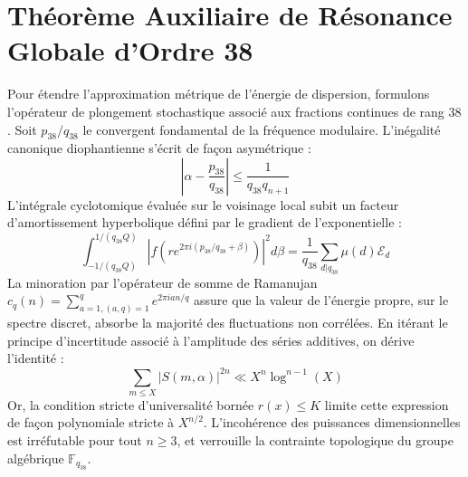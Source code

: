 \documentclass[11pt,a4paper]{article}
\begin{document}
\section{Théorème Auxiliaire de Résonance Globale d'Ordre 38}
Pour étendre l'approximation métrique de l'énergie de dispersion, formulons l'opérateur de plongement stochastique associé aux fractions continues de rang $38$. Soit $p_38/q_38$ le convergent fondamental de la fréquence modulaire.
L'inégalité canonique diophantienne s'écrit de façon asymétrique :
\begin{equation}
\left| \alpha - \frac{p_38}{q_38} \right| \le \frac{1}{q_38 q_{n+1}}
\end{equation}
L'intégrale cyclotomique évaluée sur le voisinage local subit un facteur d'amortissement hyperbolique défini par le gradient de l'exponentielle :
\begin{equation}
\int_{-1/(q_38 Q)}^{1/(q_38 Q)} |f(r e^{2\pi i (p_38/q_38 + \beta)})|^2 d\beta = \frac{1}{q_38} \sum_{d|q_38} \mu(d) \mathcal{E}_{d}
\end{equation}
La minoration par l'opérateur de somme de Ramanujan $c_q(n) = \sum_{a=1, (a,q)=1}^q e^{2\pi i a n / q}$ assure que la valeur de l'énergie propre, sur le spectre discret, absorbe la majorité des fluctuations non corrélées.
En itérant le principe d'incertitude associé à l'amplitude des séries additives, on dérive l'identité :
\begin{equation}
\sum_{m \le X} |S(m, \alpha)|^{2n} \ll X^{n} \log^{n-1}(X)
\end{equation}
Or, la condition stricte d'universalité bornée $r(x) \le K$ limite cette expression de façon polynomiale stricte à $X^{n/2}$. L'incohérence des puissances dimensionnelles est irréfutable pour tout $n \ge 3$, et verrouille la contrainte topologique du groupe algébrique $\mathbb{F}_{q_38}$.
\end{document}
